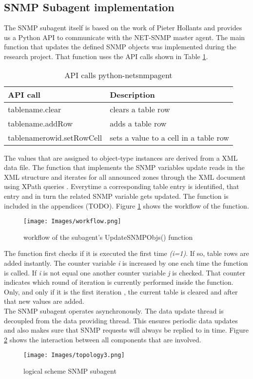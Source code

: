 \subsection{SNMP Subagent implementation}
\label{section:sub-agent-implementation}
The SNMP subagent itself is based on the work of Pieter Hollants \cite{pythonnetsnmpagent} and provides us a Python API to communicate with the NET-SNMP master agent. The main function that updates the defined SNMP objects was implemented during the research project. That function uses the API calls shown in Table \ref{table:api-calls}.

\begin{table}[H]
\begin{tabular}{|l|p{5.5cm}|}
\hline 
\textbf{API call} & \textbf{Description} \\ 
\hline 
tablename.clear & clears a table row\\ 
\hline 
tablename.addRow & adds a table row\\ 
\hline 
tablenamerowid.setRowCell & sets a value to a cell in a table row\\ 
\hline 
\end{tabular} 
\caption{API calls python-netsnmpagent}
\label{table:api-calls}
\end{table}

The values that are assigned to object-type instances are derived from a XML data file. The function that implements the SNMP variables update reads in the XML structure and iterates for all announced zones through the XML document using XPath queries \citep{xpath}. Everytime a corresponding table  entry is identified, that entry and in turn the related SNMP variable gets updated. The function is included in the appendices (TODO). Figure \ref{figure:workflow} shows the  workflow of the function.

\begin{figure}[H]
\centering
\texttt{[image: Images/workflow.png]}
\caption{workflow of the subagent's UpdateSNMPObjs() function}
\label{figure:workflow}
\end{figure}

The function first checks if it is executed the first time \textit{(i=1)}. If so, table rows are added instantly. The counter variable \textit{i} is increased by one each time the function is called. If \textit{i} is not equal one  another counter variable \textit{j} is checked. That counter indicates which round of iteration is currently performed inside the function. Only, and only if it is the first iteration , the current table is cleared and after that new values are added.
\\
The SNMP subagent operates asynchronously. The data update thread is decoupled from the data providing thread. This ensures periodic data updates and also makes sure that SNMP requests will always be replied to in time. Figure \ref{figure:subagent} shows the interaction between all components that are involved.

\begin{figure}[H]
\centering
\texttt{[image: Images/topology3.png]}
\caption{logical scheme SNMP subagent}
\label{figure:subagent}
\end{figure}
 

 








